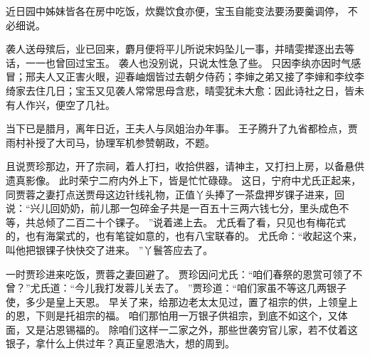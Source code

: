 近日园中姊妹皆各在房中吃饭，炊爨饮食亦便，宝玉自能变法要汤要羹调停，
不必细说。
\par
袭人送母殡后，业已回来，麝月便将平儿所说宋妈坠儿一事，并晴雯撵逐出去等话，一一也曾回过宝玉。
袭人也没别说，只说太性急了些。
只因李纨亦因时气感冒；邢夫人又正害火眼，迎春岫烟皆过去朝夕侍药；李婶之弟又接了李婶和李纹李绮家去住几日；宝玉又见袭人常常思母含悲，晴雯犹未大愈：因此诗社之日，皆未有人作兴，便空了几社。
\par
当下已是腊月，离年日近，王夫人与凤姐治办年事。
王子腾升了九省都检点，贾雨村补授了大司马，协理军机参赞朝政，不题。
\par
且说贾珍那边，开了宗祠，着人打扫，收拾供器，请神主，又打扫上房，以备悬供遗真影像。
此时荣宁二府内外上下，皆是忙忙碌碌。
这日，宁府中尤氏正起来，同贾蓉之妻打点送贾母这边针线礼物，正值丫头捧了一茶盘押岁锞子进来，回说：“兴儿回奶奶，前儿那一包碎金子共是一百五十三两六钱七分，里头成色不等，共总倾了二百二十个锞子。
”说着递上去。
尤氏看了看，只见也有梅花式的，也有海棠式的，也有笔锭如意的，也有八宝联春的。
尤氏命：“收起这个来，叫他把银锞子快快交了进来。
”丫鬟答应去了。
\par
一时贾珍进来吃饭，贾蓉之妻回避了。
贾珍因问尤氏：“咱们春祭的恩赏可领了不曾？”尤氏道：“今儿我打发蓉儿关去了。
”贾珍道：“咱们家虽不等这几两银子使，多少是皇上天恩。
早关了来，给那边老太太见过，置了祖宗的供，上领皇上的恩，下则是托祖宗的福。
咱们那怕用一万银子供祖宗，到底不如这个，又体面，又是沾恩锡福的。
除咱们这样一二家之外，那些世袭穷官儿家，若不仗着这银子，拿什么上供过年？真正皇恩浩大，想的周到。
